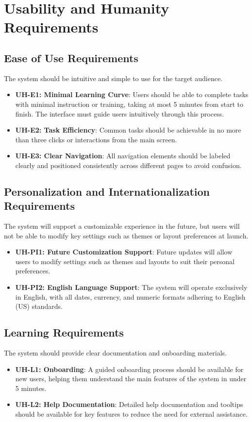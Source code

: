 \documentclass[12pt]{article}
\begin{document}
\section{Usability and Humanity Requirements}

\subsection{Ease of Use Requirements}
The system should be intuitive and simple to use for the target audience.
\begin{itemize}
    \item \textbf{UH-E1: Minimal Learning Curve}: Users should be able to complete tasks 
    with minimal instruction or training, taking at most 5 minutes from start 
    to finish. The interface must guide users intuitively through this process.
    
    \item \textbf{UH-E2: Task Efficiency}: Common tasks should be achievable in no more 
    than three clicks or interactions from the main screen.
    
    \item \textbf{UH-E3: Clear Navigation}: All navigation elements should be labeled 
    clearly and positioned consistently across different pages to avoid confusion.
\end{itemize}

\subsection{Personalization and Internationalization Requirements}
The system will support a customizable experience in the future, but users will 
not be able to modify key settings such as themes or layout preferences at launch.
\begin{itemize}
    \item \textbf{UH-PI1: Future Customization Support}: Future updates will allow users 
    to modify settings such as themes and layouts to suit their personal preferences.
    
    \item \textbf{UH-PI2: English Language Support}: The system will operate exclusively 
    in English, with all dates, currency, and numeric formats adhering to 
    English (US) standards.
\end{itemize}

\subsection{Learning Requirements}
The system should provide clear documentation and onboarding materials.
\begin{itemize}
    \item \textbf{UH-L1: Onboarding}: A guided onboarding process should be available 
    for new users, helping them understand the main features of the system 
    in under 5 minutes.
    
    \item \textbf{UH-L2: Help Documentation}: Detailed help documentation and tooltips 
    should be available for key features to reduce the need for external 
    assistance.
\end{itemize}
\end{document}
